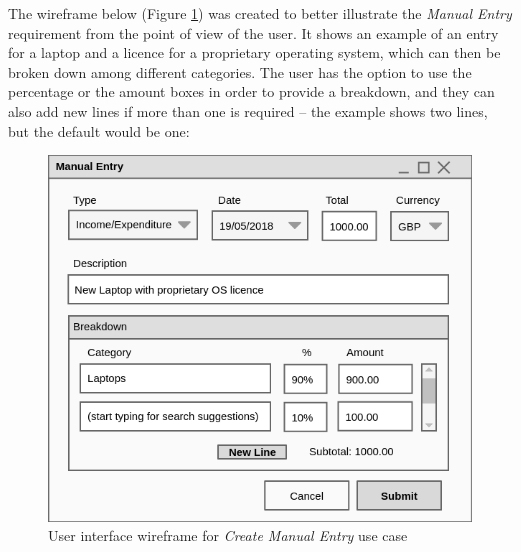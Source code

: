 The wireframe below (Figure \ref{fig:Wireframe.CreateManualEntry}) was created
to better illustrate the \emph{Manual Entry} requirement from the point of view
of the user. It shows an example of an entry for a laptop and a licence for a
proprietary operating system, which can then be broken down among different
categories. The user has the option to use the percentage or the amount boxes
in order to provide a breakdown, and they can also add new lines if more than
one is required -- the example shows two lines, but the default would be one:
\begin{figure}[ht!]
  \begin{center}
    \includegraphics[width=14cm]{./contents/img/Wireframe_-_Manual_Entry.png}
  \end{center}
  \caption{User interface wireframe for \emph{Create Manual Entry} use case}
  \label{fig:Wireframe.CreateManualEntry}
\end{figure}
\FloatBarrier

